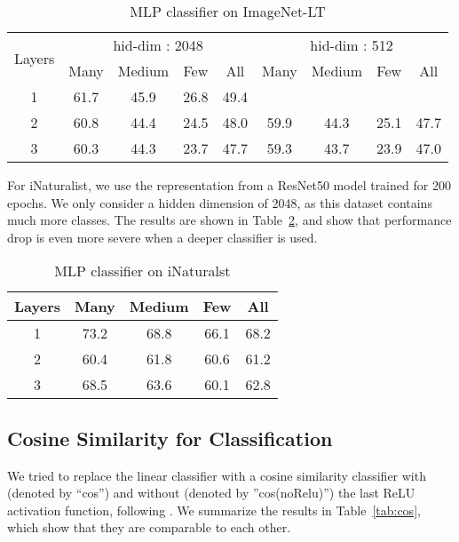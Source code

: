 \documentclass[dvipsnames]{article} \usepackage{iclr2020_conference, times}
\begin{document}
\begin{table}[h]
\small
\caption{MLP classifier on ImageNet-LT}
\label{tab:mlp_imnet}
\begin{center}
\begin{tabular}{c|cccc|cccc}
\toprule
\multirow{2}{*}{Layers} & \multicolumn{4}{c}{hid-dim : 2048} & \multicolumn{4}{|c}{hid-dim : 512} \\
 & Many & Medium & Few & All & Many & Medium & Few & All\\
\midrule
1 & 61.7 & 45.9 & 26.8 & 49.4 \\
2 & 60.8 & 44.4 & 24.5 & 48.0 & 59.9 & 44.3 & 25.1 & 47.7 \\
3 & 60.3 & 44.3 & 23.7 & 47.7 & 59.3 & 43.7 & 23.9 & 47.0 \\
\bottomrule
\end{tabular}
\end{center}
\end{table}

For iNaturalist, we use the representation from a ResNet50 model trained for 200 epochs. We only consider a hidden dimension of 2048, as this dataset contains much more classes. The results are shown in Table~\ref{tab:mlp_inat}, and show that performance drop is even more severe when a deeper classifier is used. 

\begin{table}[h]
\small
\caption{MLP classifier on iNaturalst}
\label{tab:mlp_inat}
\begin{center}
\begin{tabular}{c|cccc}
\toprule
Layers & Many & Medium & Few & All \\
\midrule
1 & 73.2 & 68.8 & 66.1 & 68.2 \\
2 & 60.4 & 61.8 & 60.6 & 61.2 \\
3 & 68.5 & 63.6 & 60.1 & 62.8 \\
\bottomrule
\end{tabular}
\end{center}
\end{table}

\subsection{Cosine Similarity for Classification}
\label{sec:mlp}

We tried to replace the linear classifier with a cosine similarity classifier with (denoted by ``cos'') and without (denoted by ''cos(noRelu)'') the last ReLU activation function, following \cite{gidaris2018dynamic}. We summarize the results in Table~\ref{tab:cos}, which show that they are comparable to each other.
\end{document}
